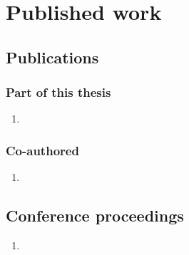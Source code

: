 \chapter{Published work}

\begin{refsection}
\nocite{*}  %
\removeDOI
{}  %


\section*{Publications}

\subsection*{Part of this thesis}
\begin{enumerate}
\item {}
\end{enumerate}

\subsection*{Co-authored}
\begin{enumerate}
	\item {}
\end{enumerate}

\section*{Conference proceedings}
\begin{enumerate}
	\item {}
\end{enumerate}

\end{refsection}
